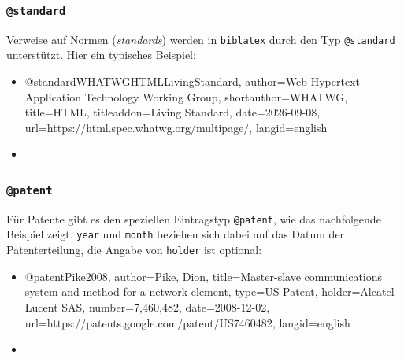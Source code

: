 
\subsubsection{\texttt{\bfseries @standard}}
\label{sec:@standard}

Verweise auf Normen (\emph{standards}) werden in \texttt{biblatex} durch den
Typ \texttt{@standard} unterstützt. Hier ein typisches Beispiel:
%
\begin{itemize}
\item[]
\begin{GenericCode}[numbers=none]
@standard{WHATWGHTMLLivingStandard,
  author={{Web Hypertext Application Technology Working Group}},
  shortauthor={WHATWG},
  title={HTML},
  titleaddon={Living Standard},
  date={2026-09-08},
  url={https://html.spec.whatwg.org/multipage/},
  langid={english}
}
\end{GenericCode}
\item[\cite{WHATWGHTMLLivingStandard}] 
\end{itemize}
%


\subsubsection{\texttt{\bfseries @patent}}
\label{sec:@patent}

Für Patente gibt es den speziellen Eintragstyp \texttt{@patent}, wie das
nachfolgende Beispiel zeigt. \texttt{year} und \texttt{month} beziehen sich
dabei auf das Datum der Patenterteilung, die Angabe von \texttt{holder} ist
optional:
%
\begin{itemize}
\item[]
\begin{GenericCode}[numbers=none]
@patent{Pike2008,
  author={Pike, Dion},
  title={Master-slave communications system and method for a network element},
  type={US Patent},
  holder={Alcatel-Lucent SAS},
  number={7,460,482},
  date={2008-12-02},
  url={https://patents.google.com/patent/US7460482},
  langid={english}
}
\end{GenericCode}
\item[\cite{Pike2008}] 
\end{itemize}
%



